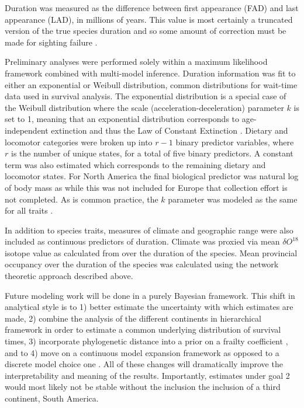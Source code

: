 \documentclass[11pt,letterpaper]{article}
\begin{document}
Duration was measured as the difference between first appearance (FAD) and last appearance (LAD), in millions of years. This value is most certainly a truncated version of the true species duration and so some amount of correction must be made for sighting failure \citep{Alroy2014a,Solow1997,Strauss1989}.

Preliminary analyses were performed solely within a maximum likelihood framework combined with multi-model inference. Duration information was fit to either an exponential or Weibull distribution, common distributions for wait-time data used in survival analysis. The exponential distribution is a special case of the Weibull distribution where the scale (acceleration-deceleration) parameter \(k\) is set to 1, meaning that an exponential distribution corresponds to age-independent extinction and thus the Law of Constant Extinction \citep{VanValen1979}. Dietary and locomotor categories were broken up into \(r - 1\) binary predictor variables, where \(r\) is the number of unique states, for a total of five binary predictors. A constant term was also estimated which corresponds to the remaining dietary and locomotor states. For North America the final biological predictor was natural log of body mass as while this was not included for Europe that collection effort is not completed. As is common practice, the \(k\) parameter was modeled as the same for all traits \citep{Kleinbaum2005}. %

In addition to species traits, measures of climate and geographic range were also included as continuous predictors of duration. Climate was proxied via mean \(\delta O^{18}\) isotope value as calculated from \citet{Zachos2008} over the duration of the species. Mean provincial occupancy over the duration of the species was calculated using the network theoretic approach described above.


Future modeling work will be done in a purely Bayesian framework. This shift in analytical style is to 1) better estimate the uncertainty with which estimates are made, 2) combine the analysis of the different continents in hierarchical framework in order to estimate a common underlying distribution of survival times, 3) incorporate phylogenetic distance into a prior on a frailty coefficient \citep{Banerjee2003a,Ibrahim2001}, and to 4) move on a continuous model expansion framework as opposed to a discrete model choice one \citep{Gelman2013d}. All of these changes will dramatically improve the interpretability and meaning of the results. Importantly, estimates under goal 2 would most likely not be stable without the inclusion the inclusion of a third continent, South America. 
\end{document}
